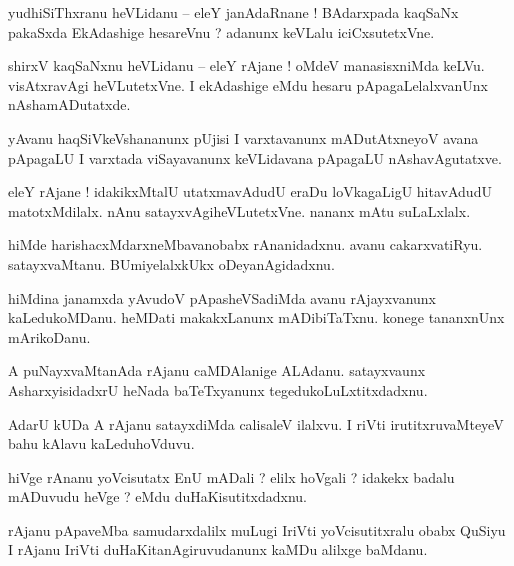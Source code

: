 \documentclass{article}
\begin{document}
\begin{mn}%
yudhiSiThxranu heVLidanu -- eleY janAdaRnane ! BAdarxpada kaqSaNx pakaSxda EkAdashige hesareVnu ? 
adanunx keVLalu iciCxsutetxVne.
\end{mn}

\begin{mn}%
shirxV kaqSaNxnu heVLidanu -- eleY rAjane ! oMdeV manasisxniMda keLVu. visAtxravAgi heVLutetxVne. I 
ekAdashige eMdu hesaru pApagaLelalxvanUnx nAshamADutatxde.
\end{mn}

\begin{mn}%
yAvanu haqSiVkeVshananunx pUjisi I varxtavanunx mADutAtxneyoV avana pApagaLU I varxtada 
viSayavanunx keVLidavana pApagaLU nAshavAgutatxve.
\end{mn}

\begin{mn}%
eleY rAjane ! idakikxMtalU utatxmavAdudU eraDu loVkagaLigU hitavAdudU matotxMdilalx. nAnu 
satayxvAgiheVLutetxVne. nananx mAtu suLaLxlalx.
\end{mn}

\begin{mn}%
hiMde harishacxMdarxneMbavanobabx rAnanidadxnu. avanu cakarxvatiRyu. satayxvaMtanu. BUmiyelalxkUkx 
oDeyanAgidadxnu.
\end{mn}

\begin{mn}%
hiMdina janamxda yAvudoV pApasheVSadiMda avanu rAjayxvanunx kaLedukoMDanu. heMDati makakxLanunx 
mADibiTaTxnu. konege tananxnUnx mArikoDanu.
\end{mn}

\begin{mn}%
A puNayxvaMtanAda rAjanu caMDAlanige ALAdanu. satayxvaunx AsharxyisidadxrU heNada baTeTxyanunx 
tegedukoLuLxtitxdadxnu.
\end{mn}

\begin{mn}%
AdarU kUDa A rAjanu satayxdiMda calisaleV ilalxvu. I riVti irutitxruvaMteyeV bahu kAlavu 
kaLeduhoVduvu.
\end{mn}

\begin{mn}%
hiVge rAnanu yoVcisutatx EnU mADali ? elilx hoVgali ? idakekx badalu mADuvudu heVge ? eMdu 
duHaKisutitxdadxnu.
\end{mn}

\begin{mn}%
rAjanu pApaveMba samudarxdalilx muLugi IriVti yoVcisutitxralu obabx QuSiyu I rAjanu IriVti 
duHaKitanAgiruvudanunx kaMDu alilxge baMdanu.
\end{mn}
\end{document}
